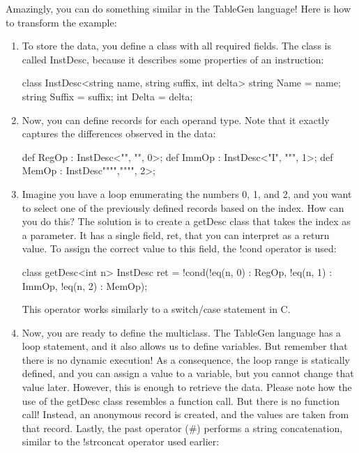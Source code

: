 Amazingly, you can do something similar in the TableGen language! Here is how to transform the example:

\begin{enumerate}
\item
To store the data, you define a class with all required fields. The class is called InstDesc, because it describes some properties of an instruction:

\begin{shell}
class InstDesc<string name, string suffix, int delta> {
    string Name = name;
    string Suffix = suffix;
    int Delta = delta;
}
\end{shell}

\item
Now, you can define records for each operand type. Note that it exactly captures the differences observed in the data:

\begin{shell}
def RegOp : InstDesc<"", "", 0>;
def ImmOp : InstDesc<"I", """, 1>;
def MemOp : InstDesc"""","""", 2>;
\end{shell}

\item
Imagine you have a loop enumerating the numbers 0, 1, and 2, and you want to select one of the previously defined records based on the index. How can you do this? The solution is to create a getDesc class that takes the index as a parameter. It has a single field, ret, that you can interpret as a return value. To assign the correct value to this field, the !cond operator is used:

\begin{shell}
class getDesc<int n> {
    InstDesc ret = !cond(!eq(n, 0) : RegOp,
                         !eq(n, 1) : ImmOp,
                         !eq(n, 2) : MemOp);
}
\end{shell}

This operator works similarly to a switch/case statement in C.

\item
Now, you are ready to define the multiclass. The TableGen language has a loop statement, and it also allows us to define variables. But remember that there is no dynamic execution! As a consequence, the loop range is statically defined, and you can assign a value to a variable, but you cannot change that value later. However, this is enough to retrieve the data. Please note how the use of the getDesc class resembles a function call. But there is no function call! Instead, an anonymous record is created, and the values are taken from that record. Lastly, the past operator (\#) performs a string concatenation, similar to the !strconcat operator used earlier:


\end{enumerate}
